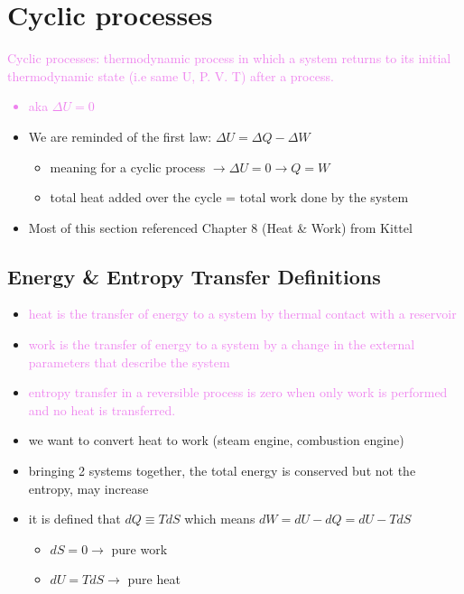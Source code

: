 
\section{Cyclic processes}

\textcolor{violet}{Cyclic processes: thermodynamic process in which a system returns to its initial
	thermodynamic state (i.e same U, P. V. T) after a process.
	\begin{itemize}
		\item aka $\Delta U = 0$
	\end{itemize}
}
\begin{itemize}
	\item We are reminded of the first law: $\Delta U = \Delta Q - \Delta W$
	      \begin{itemize}
		      \item meaning for a cyclic process  $\rightarrow \Delta U = 0 \rightarrow Q = W$
		      \item total heat added over the cycle = total work done by the system
	      \end{itemize}
	\item Most of this section referenced Chapter 8 (Heat \& Work) from Kittel
\end{itemize}


\subsection{Energy \& Entropy Transfer Definitions}
\begin{itemize}
	\item \textcolor{violet}{heat is the transfer of energy to a system by thermal contact
		      with a reservoir}
	\item \textcolor{violet}{work is the transfer of energy to a system by a change in the
		      external parameters that describe the system}
    \item \textcolor{violet}{entropy transfer in a reversible process is zero when only work is 
    performed and no heat is transferred.}
	\item we want to convert heat to work (steam engine, combustion engine)
	\item bringing 2 systems together, the total energy is conserved but not the entropy,
	      may increase
	\item it is defined that $dQ \equiv T dS$ which means $dW = dU - dQ = dU - TdS$
	      \begin{itemize}
		      \item $dS = 0 \rightarrow$ pure work
		      \item $dU = TdS \rightarrow$ pure heat
	      \end{itemize}
\end{itemize}


